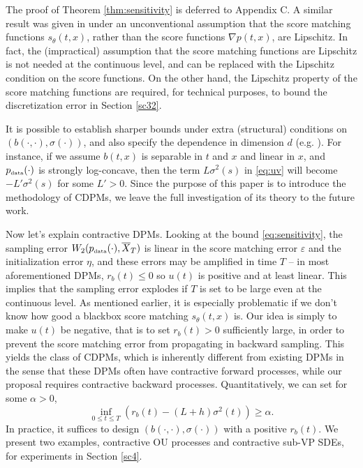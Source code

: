 \documentclass[letterpaper,11pt,reqno]{amsart}
\numberwithin{equation}{section}
\begin{document}
\quad The proof of Theorem \ref{thm:sensitivity} is deferred to Appendix C.
A similar result was given in \cite{KW22} 
under an unconventional assumption that
the score matching functions $s_\theta(t,x)$,
rather than the score functions $\nabla p(t,x)$,
are Lipschitz.
In fact,
the (impractical) assumption that 
the score matching functions are Lipschitz
is not needed at the continuous level,
and can be replaced with the Lipschitz condition on the score functions.
On the other hand,
the Lipschitz property of the score matching functions
are required, for technical purposes,
to bound the discretization error in Section \ref{sc32}.

\quad It is possible to establish sharper bounds under extra (structural) conditions on $(b(\cdot, \cdot), \sigma(\cdot))$, 
and also specify the dependence in dimension $d$ (e.g. \cite{Chen23, GNZ23}).
For instance, if we assume $b(t,x)$ is separable in $t$ and $x$ and linear in $x$,
and $p_{\tiny \mbox{data}}(\cdot)$ is strongly log-concave,
then the term $L \sigma^2(s)$ in \eqref{eq:uv} will become $-L' \sigma^2(s)$ for some $L' > 0$.
Since the purpose of this paper is to introduce the methodology of CDPMs, 
we leave the full investigation of its theory to the future work.

\quad Now let's explain contractive DPMs. 
Looking at the bound \eqref{eq:sensitivity}, 
the sampling error $W_2(p_{\tiny \mbox{data}}(\cdot), \overline{X}_T)$
is linear in the score matching error $\varepsilon$
and the initialization error $\eta$,
and these errors may be amplified in time $T$
-- in most aforementioned DPMs, 
$r_b(t) \le 0$ so $u(t)$ is positive and at least linear.
This implies that the sampling error explodes if $T$ is set to be large
even at the continuous level. 
As mentioned earlier,
it is especially problematic 
if we don't know how good a blackbox score matching $s_\theta(t,x)$ is.
Our idea is simply
 to make $u(t)$ be negative, that is to set $r_b(t) > 0$ sufficiently large, 
in order to prevent the score matching error from propagating in backward sampling.
This yields the class of CDPMs,
which is inherently different from existing DPMs in the sense that
these DPMs often have contractive forward processes,
while our proposal requires contractive backward processes.
Quantitatively, we can set for some $\alpha > 0$,
\begin{equation}
\label{eq:contra1}
\inf_{0 \le t \le T} \left(r_b(t) - (L + h) \sigma^2(t) \right) \ge \alpha.
\end{equation} 
In practice, it suffices to design $(b(\cdot, \cdot), \sigma(\cdot))$ with a positive $r_b(t)$.
We present two examples, contractive OU processes and contractive sub-VP SDEs,
for experiments in Section \ref{sc4}.
\end{document}
